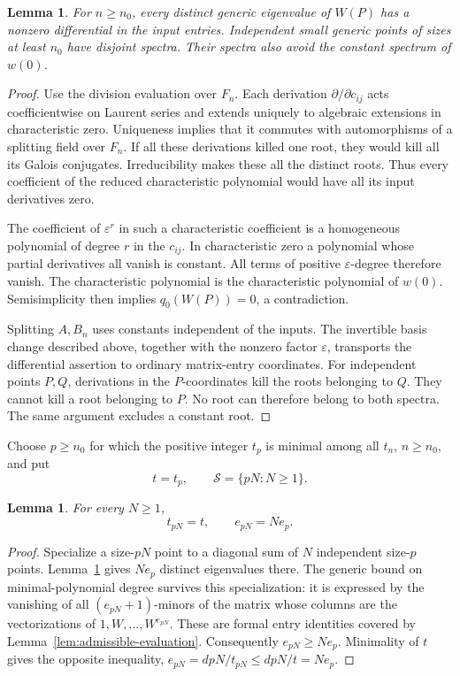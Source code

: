 \documentclass[11pt]{article}
\newtheorem{lemma}[theorem]{Lemma}
\theoremstyle{definition}
\theoremstyle{remark}
\numberwithin{equation}{section}
\begin{document}
\begin{lemma}\label{lem:nonconstant-roots}
For $n\ge n_0$, every distinct generic eigenvalue of $W(P)$ has a
nonzero differential in the input entries.  Independent small generic
points of sizes at least $n_0$ have disjoint spectra.  Their spectra
also avoid the constant spectrum of $w(0)$.
\end{lemma}

\begin{proof}
Use the division evaluation over $F_n$.  Each derivation
$\partial/\partial c_{ij}$ acts coefficientwise on Laurent series
and extends uniquely to algebraic extensions in characteristic zero.
Uniqueness implies that it commutes with automorphisms of a splitting
field over $F_n$.  If all these derivations killed one root, they
would kill all its Galois conjugates.  Irreducibility makes these all
the distinct roots.  Thus every coefficient of the reduced
characteristic polynomial would have all its input derivatives zero.

The coefficient of $\varepsilon^r$ in such a characteristic
coefficient is a homogeneous polynomial of degree $r$ in the
$c_{ij}$.  In characteristic zero a polynomial whose partial
derivatives all vanish is constant.  All terms of positive
$\varepsilon$-degree therefore vanish.  The characteristic polynomial
is the characteristic polynomial of $w(0)$.  Semisimplicity then
implies $q_0(W(P))=0$, a contradiction.

Splitting $A,B_n$ uses constants independent of the inputs.  The
invertible basis change described above, together with the nonzero
factor $\varepsilon$, transports the differential assertion to
ordinary matrix-entry coordinates.  For independent points $P,Q$,
derivations in the $P$-coordinates kill the roots belonging to $Q$.
They cannot kill a root belonging to $P$.  No root can therefore
belong to both spectra.  The same argument excludes a constant root.
\end{proof}

Choose $p\ge n_0$ for which the positive integer $t_p$ is minimal
among all $t_n$, $n\ge n_0$, and put
\[
 t=t_p,\qquad \mathcal S=\{pN:N\ge1\}.
\]

\begin{lemma}\label{lem:stable-multiplicity}
For every $N\ge1$,
\[
 t_{pN}=t,\qquad e_{pN}=Ne_p.
\]
\end{lemma}

\begin{proof}
Specialize a size-$pN$ point to a diagonal sum of $N$ independent
size-$p$ points.  Lemma~\ref{lem:nonconstant-roots} gives $Ne_p$
distinct eigenvalues there.  The generic bound on minimal-polynomial
degree survives this specialization: it is expressed by the vanishing
of all $(e_{pN}+1)$-minors of the matrix whose columns are the
vectorizations of $1,W,\ldots,W^{e_{pN}}$.  These are formal entry
identities covered by Lemma~\ref{lem:admissible-evaluation}.
Consequently $e_{pN}\ge Ne_p$.  Minimality of $t$ gives the opposite
inequality,
$e_{pN}=dpN/t_{pN}\le dpN/t=Ne_p$.
\end{proof}
\end{document}
